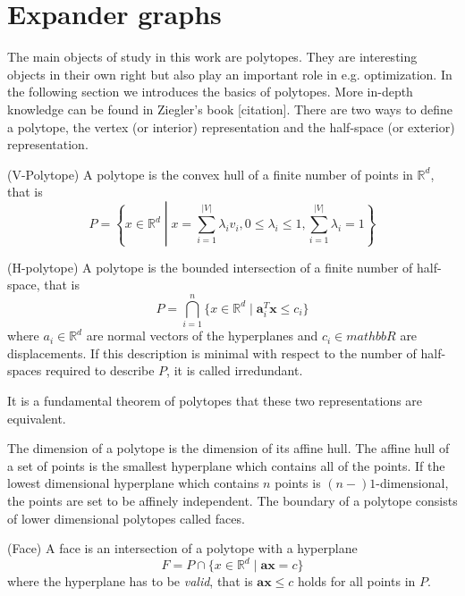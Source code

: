 \chapter{Expander graphs}
\label{mathchapter}


The main objects of study in this work are polytopes. They are interesting 
objects in their own right but also play an important role in e.g. 
optimization. In the following section we introduces the basics of polytopes. 
More in-depth knowledge can be found in Ziegler's book [citation]. There are 
two ways to define a polytope, the vertex (or interior) representation and the 
half-space (or exterior) representation.

\begin{definition}
(V-Polytope) A polytope is the convex hull of a finite number of points in 
$\mathbb{R}^d$, that is 
\begin{equation}
 P = \left\{x\in \mathbb{R}^d \middle| x = \sum_{i=1}^{|V|} \lambda_i v_i, 
0\leq \lambda_i \leq 1, \sum_{i=1}^{|V|} \lambda_i = 1 \right\}
\end{equation}

\end{definition}

\begin{definition}
 (H-polytope) A polytope is the bounded intersection of a finite number of 
half-space, that is
\begin{equation}
 P = \bigcap_{i=1}^n \{x \in \mathbb{R}^d \mid \mathbf{a}_i^T \mathbf{x} \leq 
c_i \}
\end{equation}
where $a_i \in \mathbb{R}^d$ are normal vectors of the hyperplanes and $c_i \in 
mathbb{R}$ are displacements. If this description is minimal with respect to 
the number of half-spaces required to describe $P$, it is called irredundant.
\end{definition}

It is a fundamental theorem of polytopes that these two representations are 
equivalent.

The dimension of a polytope is the dimension of its affine hull. The affine 
hull of a set of points is the smallest hyperplane which contains all of the 
points. If the lowest dimensional hyperplane which contains $n$ points is 
$(n-)1$-dimensional, the points are set to be affinely independent. The 
boundary 
of a polytope consists of lower dimensional polytopes called faces. 
\begin{definition}
 (Face) A face is an intersection of a polytope with a hyperplane 
\begin{equation}
 F = P \cap \{x \in \mathbb{R}^d \mid \mathbf{a}\mathbf{x} = c\}
\end{equation}
where the hyperplane has to be \textit{valid}, that is $\mathbf{a}\mathbf{x} 
\leq c$ holds for all points in $P$. 

\end{definition}

